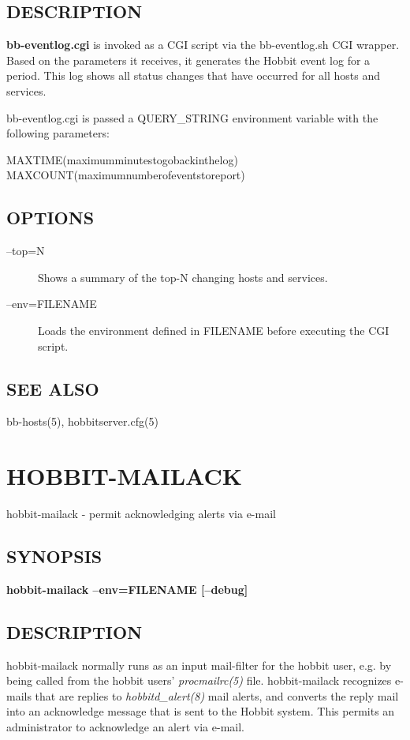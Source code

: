  

\subsection{DESCRIPTION}
\textbf{bb-eventlog.cgi}
 is invoked as a CGI script via the bb-eventlog.sh CGI wrapper. Based
 on the parameters it receives, it generates the Hobbit event log for
 a period. This log shows all status changes that have occurred for
 all hosts and services. 


  bb-eventlog.cgi is passed a QUERY\_STRING environment variable with the following parameters: 


  
MAXTIME(maximumminutestogobackinthelog)  
MAXCOUNT(maximumnumberofeventstoreport) 


 
\subsection{OPTIONS}
\begin{description}
\item[--top=N] Shows a summary of the top-N changing hosts and services. 

 

\item[--env=FILENAME] Loads the environment defined in FILENAME before executing the CGI script. 

\end{description}
\subsection{SEE ALSO}
bb-hosts(5), hobbitserver.cfg(5) 

%
%
\newpage
\section{HOBBIT-MAILACK}

 hobbit-mailack - permit acknowledging alerts via e-mail \subsection{SYNOPSIS}
\textbf{hobbit-mailack --env=FILENAME [--debug]}


 
\subsection{DESCRIPTION}
 hobbit-mailack normally runs as an input mail-filter for the hobbit user, e.g. by being called from the hobbit users' \emph{procmailrc(5)}
 file. hobbit-mailack recognizes e-mails that are replies to \emph{hobbitd\_alert(8)}
 mail alerts, and converts the reply mail into an acknowledge message that is sent to the Hobbit system. This permits an administrator to acknowledge an alert via e-mail. 

